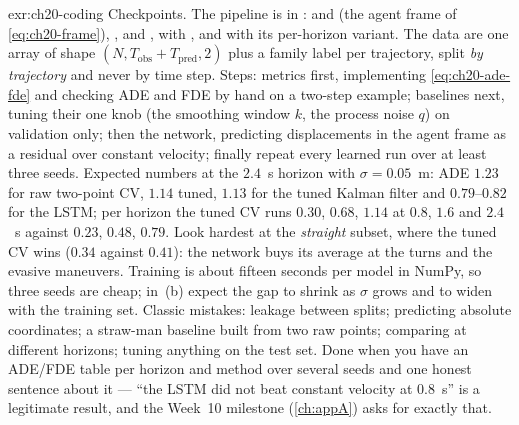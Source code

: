 
\begin{solution}{exr:ch20-coding}
Checkpoints. The pipeline is in :  and
 (the agent frame of \cref{eq:ch20-frame}), ,
 and ,  with
, and  with its per-horizon variant. The data are
one array of shape $(N,T_{\mathrm{obs}}+T_{\mathrm{pred}},2)$ plus a family label per
trajectory, split \emph{by trajectory} and never by time step. Steps: metrics first,
implementing \cref{eq:ch20-ade-fde} and checking ADE and FDE by hand on a two-step
example; baselines next, tuning their one knob (the smoothing window $k$, the process
noise $q$) on validation only; then the network, predicting displacements in the agent
frame as a residual over constant velocity; finally repeat every learned run over at least
three seeds. Expected numbers at the $2.4$~s horizon with $\sigma=0.05$~m: ADE $1.23$ for
raw two-point CV, $1.14$ tuned, $1.13$ for the tuned Kalman filter and $0.79$--$0.82$ for
the LSTM; per horizon the tuned CV runs $0.30$, $0.68$, $1.14$ at $0.8$, $1.6$ and $2.4$~s
against $0.23$, $0.48$, $0.79$. Look hardest at the \emph{straight} subset, where the
tuned CV wins ($0.34$ against $0.41$): the network buys its average at the turns and the
evasive maneuvers. Training is about fifteen seconds per model in NumPy, so three seeds
are cheap; in~(b) expect the gap to shrink as $\sigma$ grows and to widen with the
training set. Classic mistakes: leakage between splits; predicting absolute coordinates; a
straw-man baseline built from two raw points; comparing at different horizons; tuning
anything on the test set. Done when you have an ADE/FDE table per horizon and method over
several seeds and one honest sentence about it --- ``the LSTM did not beat constant
velocity at $0.8$~s'' is a legitimate result, and the Week~10 milestone (\cref{ch:appA})
asks for exactly that.
\end{solution}

